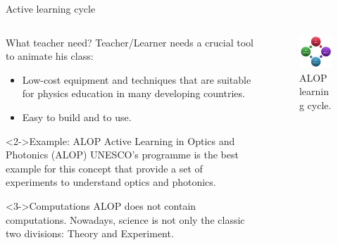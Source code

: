 \documentclass[serif ,mathserif, 8pt]{beamer}
\begin{document}
\begin{frame}{Active learning cycle}
	\begin{columns}[c]
		\begin{column}{0.6\textwidth}
			\begin{block}{What teacher need?}
				Teacher/Learner needs a crucial tool to animate his class:
				\begin{itemize}
					\item Low-cost equipment and techniques that are suitable for physics education in many developing countries.
					\item Easy to build and to use.
				\end{itemize}
				
			\end{block}
				
				
		\begin{exampleblock}<2->{Example: ALOP}
			Active Learning in Optics and Photonics (ALOP) UNESCO’s programme is the best example for this concept that provide a set of experiments to understand optics and photonics.
		\end{exampleblock}
		\begin{alertblock}<3->{Computations}
			ALOP does not contain computations. Nowadays, science is not only the classic two divisions: Theory and Experiment.
		\end{alertblock}
		\end{column}
		\begin{column}{0.4\textwidth}
			\begin{figure}
				\includegraphics[width=\linewidth]{images/alop_cycle}
				\caption{ALOP learning cycle.}
			\end{figure}
		\end{column}
	\end{columns}
		
\end{frame}
\end{document}
